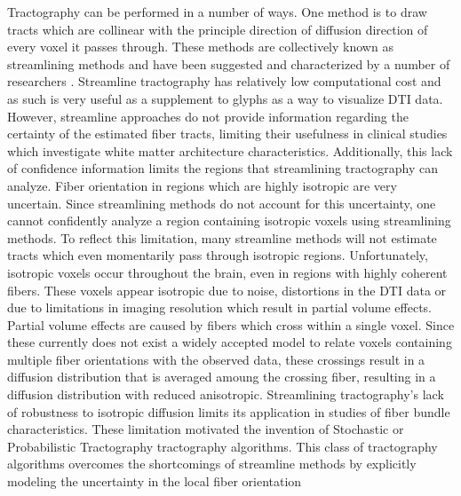 Tractography can be performed in a number of ways. One method is to draw tracts which are collinear with the principle direction of diffusion direction of every voxel it passes through.  These methods are collectively known as streamlining methods and have been suggested and characterized by a number of researchers \cite{behrensMRM03}.  Streamline tractography has relatively low computational cost and as such is very useful as a supplement to glyphs as a way to visualize DTI data.  However, streamline approaches do not provide information regarding the certainty of the estimated fiber tracts, limiting their usefulness in clinical studies which investigate white matter architecture characteristics.  Additionally, this lack of confidence information limits the regions that streamlining tractography can analyze.  Fiber orientation in regions which are highly isotropic are very uncertain.  Since streamlining methods do not account for this uncertainty, one cannot confidently analyze a region containing isotropic voxels using streamlining methods.  To reflect this limitation, many streamline methods will not estimate tracts which even momentarily pass through isotropic regions.  Unfortunately, isotropic voxels occur throughout the brain, even in regions with highly coherent fibers.  These voxels appear isotropic due to noise, distortions in the DTI data or due to limitations in imaging resolution which result in partial volume effects.  Partial volume effects are caused by fibers which cross within a single voxel.  Since these currently does not exist a widely accepted model to relate voxels containing multiple fiber orientations with the observed data, these crossings result in a diffusion distribution that is averaged amoung the crossing fiber, resulting in a diffusion distribution with reduced anisotropic.  Streamlining tractography's lack of robustness to isotropic diffusion limits its application in studies of fiber bundle characteristics.  These limitation motivated the invention of Stochastic or Probabilistic Tractography tractography algorithms.  This class of tractography algorithms overcomes the shortcomings of streamline methods by explicitly modeling the uncertainty in the local fiber orientation

